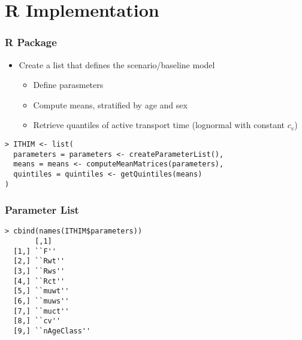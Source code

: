 \documentclass[handout,13pt,compress,c]{beamer}
\newcommand{\bi}{\begin{itemize}}
\newcommand{\ei}{\end{itemize}}
\begin{document}
\section{R Implementation}
\begin{frame}[fragile]
\frametitle{R Package}
\bi
\item Create a list that defines the scenario/baseline model
\bi \item Define parasmeters \item Compute means, stratified by age and sex \item Retrieve quantiles of active transport time (lognormal with constant $c_v$)\ei
\ei
\begin{semiverbatim}
\begin{lstlisting}
> ITHIM <- list(
  parameters = parameters <- createParameterList(),
  means = means <- computeMeanMatrices(parameters),
  quintiles = quintiles <- getQuintiles(means)
)
\end{lstlisting}
\end{semiverbatim}
\end{frame}
\begin{frame}[fragile]
\frametitle{Parameter List}
\begin{semiverbatim}
\begin{lstlisting}
> cbind(names(ITHIM$parameters))
       [,1]
  [1,] ``F''
  [2,] ``Rwt''
  [3,] ``Rws''
  [4,] ``Rct''
  [5,] ``muwt''
  [6,] ``muws''
  [7,] ``muct''
  [8,] ``cv''
  [9,] ``nAgeClass''
\end{lstlisting}
\end{semiverbatim}
\end{frame}
\end{document}
